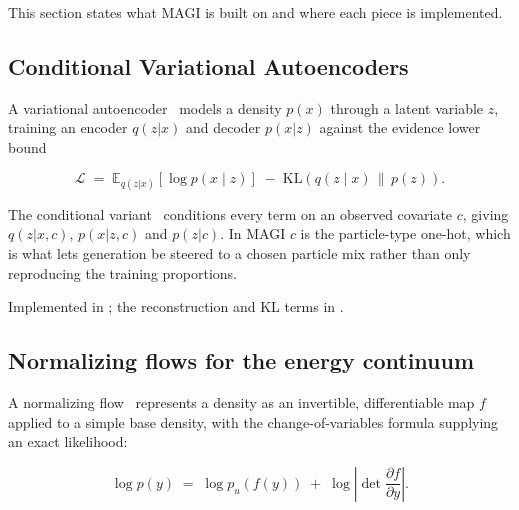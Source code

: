 \documentclass[11pt,a4paper]{article}
\begin{document}
This section states what MAGI is built on and where each piece is implemented.


\subsection{Conditional Variational Autoencoders}

A variational autoencoder~\cite{Kingma2014VAE} models a density $p(x)$ through
a latent variable $z$, training an encoder $q(z|x)$ and decoder $p(x|z)$
against the evidence lower bound

\begin{equation}
\mathcal{L} \;=\; \mathbb{E}_{q(z|x)}\!\left[\log p(x \mid z)\right]
   \;-\; \mathrm{KL}\!\left(q(z \mid x)\,\|\,p(z)\right).
\end{equation}

The conditional variant~\cite{Sohn2015CVAE} conditions every term on an
observed covariate $c$, giving $q(z|x,c)$, $p(x|z,c)$ and $p(z|c)$. In MAGI $c$
is the particle-type one-hot, which is what lets generation be steered to a
chosen particle mix rather than only reproducing the training proportions.

Implemented in ; the reconstruction and KL terms in
.

\subsection{Normalizing flows for the energy continuum}

A normalizing flow~\cite{Papamakarios2021Flows,Kobyzev2021Flows} represents a
density as an invertible, differentiable map $f$ applied to a simple base
density, with the change-of-variables formula supplying an exact likelihood:

\begin{equation}
\log p(y) \;=\; \log p_u\!\left(f(y)\right)
   \;+\; \log\left|\det \frac{\partial f}{\partial y}\right|.
\end{equation}
\end{document}
